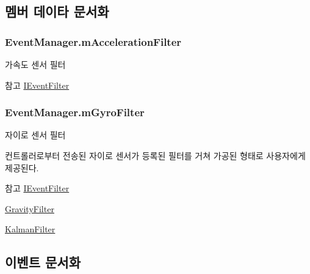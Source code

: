 \subsection{멤버 데이타 문서화}
\hypertarget{class_event_manager_a2e8707f51be09be7f400bd9cca230b3a}{}
\subsubsection[{m\+Acceleration\+Filter}]{ Event\+Manager.\+m\+Acceleration\+Filter}\label{class_event_manager_a2e8707f51be09be7f400bd9cca230b3a}
가속도 센서 필터 \begin{DoxySeeAlso}{참고}
\hyperlink{interface_i_event_filter}{I\+Event\+Filter} 
\end{DoxySeeAlso}
\hypertarget{class_event_manager_a7cee85488f5d7220c102cd945b1f494a}{}
\subsubsection[{m\+Gyro\+Filter}]{ Event\+Manager.\+m\+Gyro\+Filter}\label{class_event_manager_a7cee85488f5d7220c102cd945b1f494a}
자이로 센서 필터

컨트롤러로부터 전송된 자이로 센서가 등록된 필터를 거쳐 가공된 형태로 사용자에게 제공된다. \begin{DoxySeeAlso}{참고}
\hyperlink{interface_i_event_filter}{I\+Event\+Filter} 

\hyperlink{class_gravity_filter}{Gravity\+Filter} 

\hyperlink{class_kalman_filter}{Kalman\+Filter} 
\end{DoxySeeAlso}


\subsection{이벤트 문서화}
\hypertarget{class_event_manager_a653a885d332bd10bf53a1f8e6a8c36cd}{}
